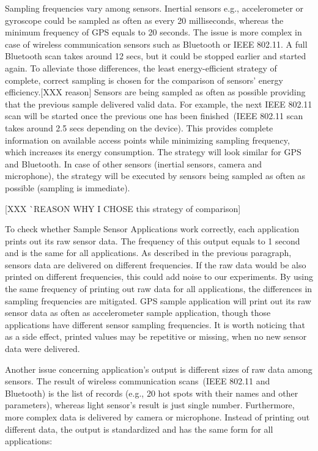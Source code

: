 Sampling frequencies vary among sensors. Inertial sensors e.g., accelerometer or gyroscope could be sampled as often as every 20 milliseconds, whereas the minimum frequency of GPS equals to 20 seconds. The issue is more complex in case of wireless communication sensors such as Bluetooth or IEEE 802.11. A full Bluetooth scan takes around 12 secs, but it could be stopped earlier and started again. To alleviate those differences, the least energy-efficient strategy of complete, correct sampling is chosen for the comparison of sensors' energy efficiency.[XXX reason] Sensors are being sampled as often as possible providing that the previous sample delivered valid data. For example, the next IEEE 802.11 scan will be started once the previous one has been finished\ (IEEE 802.11 scan takes around 2.5 secs depending on the device). This provides complete information on available access points while minimizing sampling frequency, which increases its energy consumption. The strategy will look similar for GPS and Bluetooth. In case of other sensors (inertial sensors, camera and microphone), the strategy will be executed by sensors being sampled as often as possible (sampling is immediate). 

[XXX ^^ REASON WHY I CHOSE this strategy of comparison]

To check whether Sample Sensor Applications work correctly, each application prints out its raw sensor data. The frequency of this output equals to 1 second and is the same for all applications. As described in the previous paragraph, sensors data are delivered on different frequencies. If the raw data would be also printed on different frequencies, this could add noise to our experiments. By using the same frequency of printing out raw data for all applications, the differences in sampling frequencies are mitigated. GPS sample application will print out its raw sensor data as often as accelerometer sample application, though those applications have different sensor sampling frequencies. It is worth noticing that as a side effect, printed values may be repetitive or missing, when no new sensor data were delivered. 

Another issue concerning application's output is different sizes of raw data among sensors. The result of wireless communication scans\ (IEEE 802.11 and Bluetooth) is the list of records (e.g., 20 hot spots with their names and other parameters), whereas light sensor's result  is just single number. Furthermore, more complex data is delivered by camera or microphone. Instead of printing out different data, the output is standardized and has the same form for all applications:

